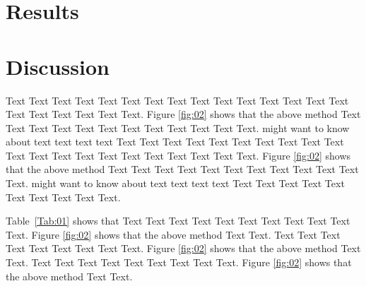 \documentclass{bioinfo}
\begin{document}
\section{Results}

%
%

\section{Discussion}

Text Text Text Text Text Text  Text Text Text Text Text Text Text Text Text  Text Text Text Text Text Text. Figure \ref{fig:02} shows that the above method  Text Text Text Text  Text Text Text Text Text Text  Text Text.  \citealp{Boffelli03} might want to know about  text text text text
Text Text Text Text Text Text  Text Text Text Text Text Text Text Text Text  Text Text Text Text Text Text. Figure \ref{fig:02} shows that the above method  Text Text Text Text  Text Text Text Text Text Text  Text Text.  \citealp{Boffelli03} might want to know about  text text text text
Text Text Text Text Text Text  Text Text Text Text.




Table~\ref{Tab:01} shows that Text Text Text Text Text  Text Text Text Text Text Text. Figure \ref{fig:02} shows that
the above method Text Text. Text Text Text  Text Text Text Text Text Text. Figure \ref{fig:02} shows that
the above method Text Text. Text Text Text  Text Text Text Text Text Text. Figure \ref{fig:02} shows that
the above method Text Text.
\end{document}
